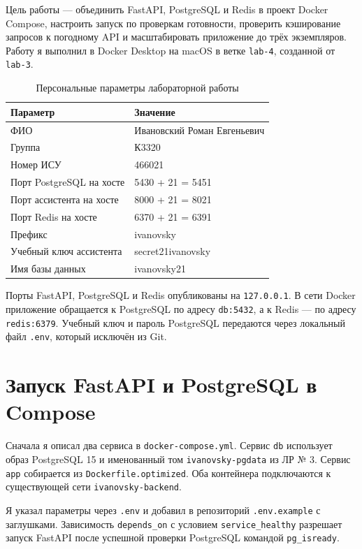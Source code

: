 Цель работы --- объединить FastAPI, PostgreSQL и Redis в проект Docker Compose, настроить запуск по проверкам готовности, проверить кэширование запросов к погодному API и масштабировать приложение до трёх экземпляров. Работу я выполнил в Docker Desktop на macOS в ветке \texttt{lab-4}, созданной от \texttt{lab-3}.

\begin{table}[H]
\caption{Персональные параметры лабораторной работы}
\begin{tabularx}{\textwidth}{|p{61mm}|X|}
\hline
Параметр & Значение \\\hline
ФИО & Ивановский Роман Евгеньевич \\\hline
Группа & К3320 \\\hline
Номер ИСУ & 466021 \\\hline
Порт PostgreSQL на хосте & 5430 + 21 = 5451 \\\hline
Порт ассистента на хосте & 8000 + 21 = 8021 \\\hline
Порт Redis на хосте & 6370 + 21 = 6391 \\\hline
Префикс & ivanovsky \\\hline
Учебный ключ ассистента & secret21ivanovsky \\\hline
Имя базы данных & ivanovsky21 \\\hline
\end{tabularx}
\end{table}

Порты FastAPI, PostgreSQL и Redis опубликованы на \texttt{127.0.0.1}. В сети Docker приложение обращается к PostgreSQL по адресу \texttt{db:5432}, а к Redis --- по адресу \texttt{redis:6379}. Учебный ключ и пароль PostgreSQL передаются через локальный файл \texttt{.env}, который исключён из Git.

\chapter{Запуск FastAPI и PostgreSQL в Compose}
Сначала я описал два сервиса в \texttt{docker-compose.yml}. Сервис \texttt{db} использует образ PostgreSQL 15 и именованный том \texttt{ivanovsky-pgdata} из ЛР № 3. Сервис \texttt{app} собирается из \texttt{Dockerfile.optimized}. Оба контейнера подключаются к существующей сети \texttt{ivanovsky-backend}.

Я указал параметры через \texttt{.env} и добавил в репозиторий \texttt{.env.example} с заглушками. Зависимость \texttt{depends\_on} с условием \texttt{service\_healthy} разрешает запуск FastAPI после успешной проверки PostgreSQL командой \texttt{pg\_isready}.

